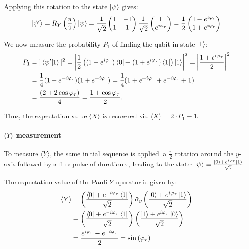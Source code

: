 Applying this rotation to the state $\ket{\psi}$ gives:
\begin{equation}
    \ket{\psi'} = R_Y\left(\frac{\pi}{2}\right) \ket{\psi} = \frac{1}{\sqrt{2}} 
\begin{pmatrix}
1 & -1 \\
1 & 1
\end{pmatrix}
\frac{1}{\sqrt{2}} 
\begin{pmatrix}
1 \\
e^{i\varphi_\tau}
\end{pmatrix}
= \frac{1}{2}
\begin{pmatrix}
1 - e^{i\varphi_\tau} \\
1 + e^{i\varphi_\tau}
\end{pmatrix}
\end{equation}

We now measure the probability $P_1$ of finding the qubit in state $\ket{1}$:
\begin{align}
    P_1 &= |\braket{\psi'|1}|^2 = \left| \frac{1}{2} \left( (1 - e^{i\varphi_\tau})\bra{0} + (1 + e^{i\varphi_\tau})\bra{1} \right) \ket{1} \right|^2 = \left| \frac{1 + e^{i\varphi_\tau}}{2} \right|^2\\
        &= \frac{1}{4} (1+e^{-i\varphi_\tau})(1+e^{+i\varphi_\tau}) = \frac{1}{4}(1 + e^{+i\varphi_\tau} + e^{-i\varphi_\tau} +1)\\ 
        &=\frac{(2+ 2\cos{\varphi_\tau})}{4} = \frac{1 + \cos{\varphi_\tau}}{2}.
\end{align}

Thus, the expectation value $\langle X \rangle$ is recovered via $\langle X \rangle = 2\cdot P_1 - 1$.

\paragraph{$\langle Y \rangle$ measurement}
To measure $\langle Y \rangle$, the same initial sequence is applied: a $\frac{\pi}{2}$ rotation around the $y$-axis followed by a flux pulse of duration $\tau$, leading to the state: $\ket{\psi}=\frac{\ket{0} + e^{i\varphi_\tau} \ket{1}}{\sqrt{2}}$.

The expectation value of the Pauli $Y$ operator is given by:
\begin{align}
    \langle Y \rangle &= \left( \frac{\bra{0} + e^{- i\varphi_\tau} \bra{1}}{\sqrt{2}} \right) \hat{\sigma}_y \left( \frac{\ket{0} + e^{ i \varphi_\tau} \ket{1}}{\sqrt{2}} \right)\\
    &= \left( \frac{\bra{0} + e^{- i \varphi_\tau} \bra{1}}{\sqrt{2}} \right) \left( \frac{\ket{1} + e^{ i \varphi_\tau} \ket{0}}{\sqrt{2}} \right)\\
    &= \frac{e^{ i \varphi_\tau} - e^{- i\varphi_\tau}}{2} = \sin{(\varphi_\tau)}
\end{align}

